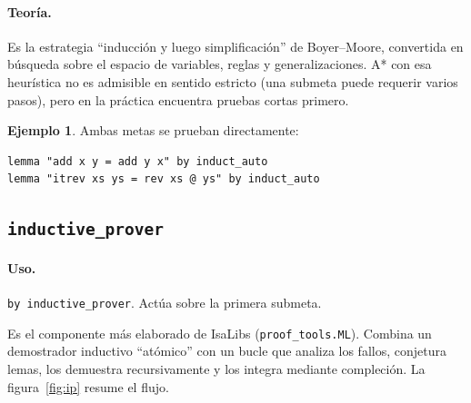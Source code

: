 \documentclass[11pt,a4paper]{article}
\newcommand{\isa}[1]{\texttt{#1}}
\theoremstyle{definition}
\newtheorem{ejemplo}[definicion]{Ejemplo}
\theoremstyle{remark}
\begin{document}
\paragraph{Teoría.}
Es la estrategia ``inducción y luego simplificación'' de Boyer--Moore, convertida en
búsqueda sobre el espacio de variables, reglas y generalizaciones. A* con esa
heurística no es admisible en sentido estricto (una submeta puede requerir varios
pasos), pero en la práctica encuentra pruebas cortas primero.

\begin{ejemplo}
Ambas metas se prueban directamente:
\begin{lstlisting}
lemma "add x y = add y x" by induct_auto
lemma "itrev xs ys = rev xs @ ys" by induct_auto
\end{lstlisting}
\end{ejemplo}

\subsection{\texttt{inductive\_prover}}
\label{sec:inductive_prover}

\paragraph{Uso.} \isa{by inductive\_prover}. Actúa sobre la primera submeta.

Es el componente más elaborado de IsaLibs (\isa{proof\_tools.ML}). Combina un
demostrador inductivo ``atómico'' con un bucle que analiza los fallos, conjetura
lemas, los demuestra recursivamente y los integra mediante compleción. La
figura~\ref{fig:ip} resume el flujo.
\end{document}

